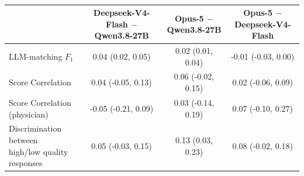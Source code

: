 \begin{table}[h]
\centering
\small
\begin{tabular}{lccc}
\toprule
 & \shortstack{Deepseek-V4-Flash \\ $-$ Qwen3.8-27B} & \shortstack{Opus-5 \\ $-$ Qwen3.8-27B} & \shortstack{Opus-5 \\ $-$ Deepseek-V4-Flash} \\
\midrule
LLM-matching $F_1$ & 0.04 (0.02, 0.05) & 0.02 (0.01, 0.04) & -0.01 (-0.03, 0.00) \\
Score Correlation & 0.04 (-0.05, 0.13) & 0.06 (-0.02, 0.15) & 0.02 (-0.06, 0.09) \\
Score Correlation (physician) & -0.05 (-0.21, 0.09) & 0.03 (-0.14, 0.19) & 0.07 (-0.10, 0.27) \\
\shortstack[l]{Discrimination between \\ high/low quality responses} & 0.05 (-0.03, 0.15) & 0.13 (0.03, 0.23) & 0.08 (-0.02, 0.18) \\
\bottomrule
\end{tabular}
\caption{}
\label{tab:existing_differences}
\end{table}

